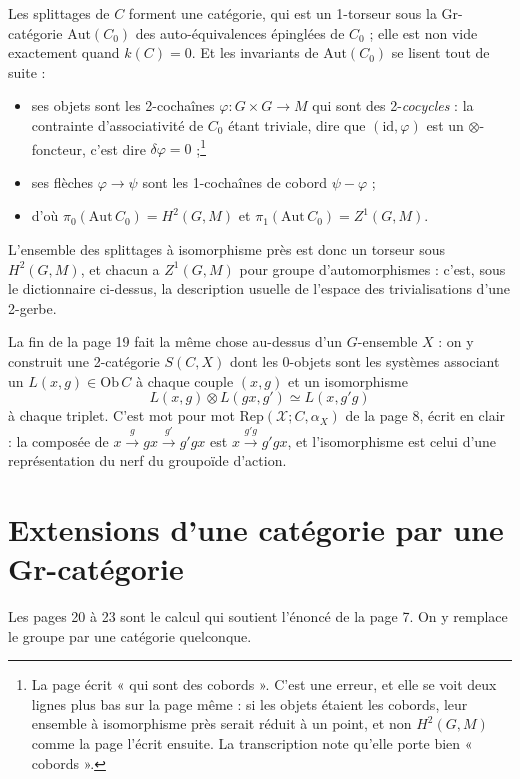 \documentclass[11pt,a4paper]{article}
\begin{document}
Les splittages de $C$ forment une catégorie, qui est un 1-torseur sous la
Gr-catégorie $\mathrm{Aut}(C_{0})$ des auto-équivalences épinglées de
$C_{0}$ ; elle est non vide exactement quand $k(C) = 0$. Et les invariants de
$\mathrm{Aut}(C_{0})$ se lisent tout de suite :

\begin{itemize}
\item ses objets sont les 2-cochaînes $\varphi : G \times G \to M$ qui sont
des 2-\emph{cocycles} : la contrainte d'associativité de $C_{0}$ étant
triviale, dire que $(\mathrm{id}, \varphi)$ est un $\otimes$-foncteur, c'est
dire $\delta\varphi = 0$ ;\footnote{La page écrit « qui sont des cobords ».
C'est une erreur, et elle se voit deux lignes plus bas sur la page même : si
les objets étaient les cobords, leur ensemble à isomorphisme près serait
réduit à un point, et non $H^{2}(G,M)$ comme la page l'écrit ensuite. La
transcription note qu'elle porte bien « cobords ».}
\item ses flèches $\varphi \to \psi$ sont les 1-cochaînes de cobord
$\psi - \varphi$ ;
\item d'où $\pi_{0}(\mathrm{Aut}\,C_{0}) = H^{2}(G,M)$ et
$\pi_{1}(\mathrm{Aut}\,C_{0}) = Z^{1}(G,M)$.
\end{itemize}

L'ensemble des splittages à isomorphisme près est donc un torseur sous
$H^{2}(G,M)$, et chacun a $Z^{1}(G,M)$ pour groupe d'automorphismes : c'est,
sous le dictionnaire ci-dessus, la description usuelle de l'espace des
trivialisations d'une 2-gerbe.

La fin de la page 19 fait la même chose au-dessus d'un $G$-ensemble $X$ : on y
construit une 2-catégorie $S(C,X)$ dont les 0-objets sont les systèmes
associant un $L(x,g) \in \mathrm{Ob}\,C$ à chaque couple $(x,g)$ et un
isomorphisme
\[
L(x,g) \otimes L(gx, g') \simeq L(x, g'g)
\]
à chaque triplet. C'est mot pour mot $\mathrm{Rep}(\mathcal{X}; C,
\alpha_{X})$ de la page 8, écrit en clair : la composée de $x
\xrightarrow{g} gx \xrightarrow{g'} g'gx$ est $x \xrightarrow{g'g} g'gx$, et
l'isomorphisme est celui d'une représentation du nerf du groupoïde d'action.

\section*{Extensions d'une catégorie par une Gr-catégorie}

Les pages 20 à 23 sont le calcul qui soutient l'énoncé de la page 7. On y
remplace le groupe par une catégorie quelconque.
\end{document}
